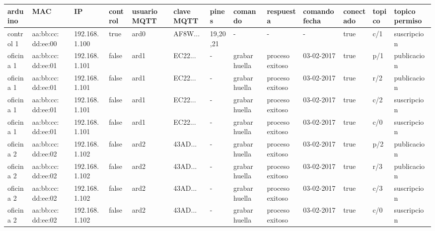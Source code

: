 \tiny
\begin{tabular}{|C{0.8cm}|C{0.8cm}|C{0.7cm}|C{0.6cm}|C{0.8cm}|C{0.8cm}|C{0.8cm}|C{0.8cm}|C{0.9cm}|C{1.1cm}|C{0.8cm}|C{0.6cm}|C{1cm}|}
  \hline
  arduino & MAC & IP & control & usuario MQTT & clave MQTT & pines & comando & respuesta & comando fecha & conectado & topico & topico permiso \\
  \hline
  control 1 & aa:bb:cc: dd:ee:00 & 192.168. 1.100 & true & ard0 & AF8W... & 19,20,21 & - & - & - & true & c/1 & suscripcion \\
  \hline
  oficina 1 & aa:bb:cc: dd:ee:01 & 192.168. 1.101 & false & ard1 & EC22... & - & grabar huella & proceso exitoso & 03-02-2017 & true & p/1 & publicacion \\
  \hline
  oficina 1 & aa:bb:cc: dd:ee:01 & 192.168. 1.101 & false & ard1 & EC22... & - & grabar huella & proceso exitoso & 03-02-2017 & true & r/2 & publicacion \\
  \hline
  oficina 1 & aa:bb:cc: dd:ee:01 & 192.168. 1.101 & false & ard1 & EC22... & - & grabar huella & proceso exitoso & 03-02-2017 & true & c/2 & suscripcion \\
  \hline
  oficina 1 & aa:bb:cc: dd:ee:01 & 192.168. 1.101 & false & ard1 & EC22... & - & grabar huella & proceso exitoso & 03-02-2017 & true & c/0 & suscripcion \\
  \hline
  oficina 2 & aa:bb:cc: dd:ee:02 & 192.168. 1.102 & false & ard2 & 43AD... & - & grabar huella & proceso exitoso & 03-02-2017 & true & p/2 & publicacion \\
  \hline
  oficina 2 & aa:bb:cc: dd:ee:02 & 192.168. 1.102 & false & ard2 & 43AD... & - & grabar huella & proceso exitoso & 03-02-2017 & true & r/3 & publicacion \\
  \hline
  oficina 2 & aa:bb:cc: dd:ee:02 & 192.168. 1.102 & false & ard2 & 43AD... & - & grabar huella & proceso exitoso & 03-02-2017 & true & c/3 & suscripcion \\
  \hline
  oficina 2 & aa:bb:cc: dd:ee:02 & 192.168. 1.102 & false & ard2 & 43AD... & - & grabar huella & proceso exitoso & 03-02-2017 & true & c/0 & suscripcion \\
  \hline
\end{tabular}